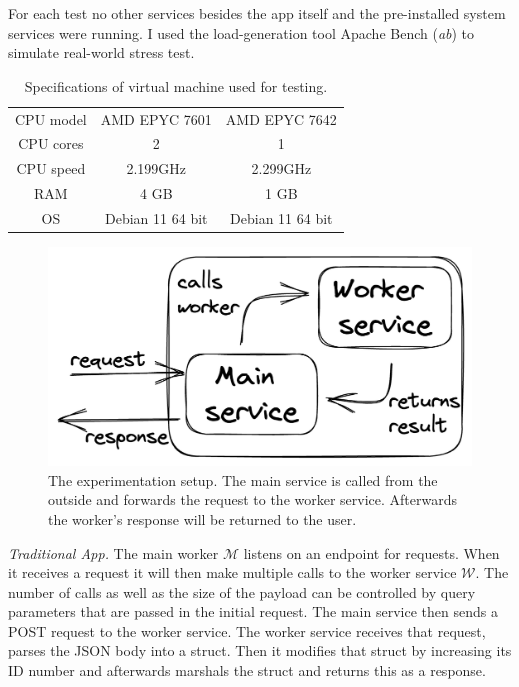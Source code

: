 \documentclass[sigconf,review,9pt]{acmart}
\begin{document}
For each test no other services besides the app itself and the pre-installed system services were running.
I used the load-generation tool Apache Bench (\emph{ab}) \cite{ApacheHTTPServer} to simulate
real-world stress test.

\begin{table}
	\caption{Specifications of virtual machine used for testing.}
	\label{tab:linode}
	\begin{tabular}{ccc}
		\toprule
		CPU model & AMD EPYC 7601    & AMD EPYC 7642    \\
		CPU cores & 2                & 1                \\
		CPU speed & 2.199GHz         & 2.299GHz         \\
		RAM       & 4 GB             & 1 GB             \\
		OS        & Debian 11 64 bit & Debian 11 64 bit \\
		\bottomrule
	\end{tabular}
\end{table}

\begin{figure}
	\includegraphics[width=\columnwidth]{setup}
	\caption{The experimentation setup. The main service is called from the outside and
		forwards the request to the worker service.
		Afterwards the worker's response will be returned to the user.}
	\label{fig:architecture}
\end{figure}

\emph{Traditional App.} The main worker $\mathcal{M}$ listens on an endpoint for requests.
When it receives a request it will then make multiple calls to the worker service
$\mathcal{W}$.
The number of calls as well as the size of the payload can be controlled by query
parameters that are passed in the initial request.
The main service then sends a POST request to the worker service.
The worker service receives that request, parses the JSON body into a struct.
Then it modifies that struct by increasing its ID number and afterwards marshals
the struct and returns this as a response.
\end{document}
